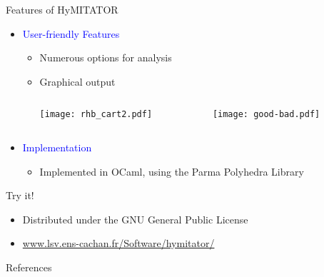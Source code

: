 \documentclass[final]{beamer}
\newcommand{\refer}[1]{\textcolor{blue}{\cite{#1}}}
\newcommand{\coulitem}[1]{\textcolor{blue}{#1}}
\newcommand{\hymitator}{HyMITATOR} %
\begin{document}
\begin{frame}{}
\begin{columns}[t]
\begin{column}{.45\linewidth}
\begin{block}{Features of \hymitator{}}
\begin{itemize}
	\item \coulitem{User-friendly Features}
	\begin{itemize}
		\item Numerous options for analysis
		\item Graphical output

		\begin{columns}
			\begin{column}{0.5\textwidth}
				\begin{center}
					\texttt{[image: rhb\_cart2.pdf]}
				\end{center}
			\end{column}
			\begin{column}{0.5\textwidth}
				\begin{center}
					\texttt{[image: good-bad.pdf]}
				\end{center}
			\end{column}
		\end{columns}
		\end{itemize}

	\item \coulitem{Implementation}  \refer{AK12}
	\begin{itemize}
		\item Implemented in OCaml, using the Parma Polyhedra Library %
	\end{itemize}
\end{itemize}

\end{block}    




\begin{block}{Try it!}

\begin{itemize}
	\item Distributed under the GNU General Public License
	\item \url{www.lsv.ens-cachan.fr/Software/hymitator/}
\end{itemize}

\end{block}


\begin{block}{References}
	\footnotesize
	
\end{block}    



\end{column}
\end{columns}
\end{frame}
\end{document}
